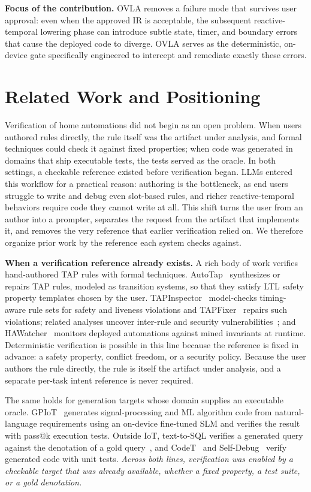 \documentclass[sigconf,nonacm,anonymous,review]{acmart}
\begin{document}
\textbf{Focus of the contribution.} OVLA removes a failure mode that survives user approval: even when the approved IR is acceptable, the subsequent reactive-temporal lowering phase can introduce subtle state, timer, and boundary errors that cause the deployed code to diverge. OVLA serves as the deterministic, on-device gate specifically engineered to intercept and remediate exactly these errors.

\section{Related Work and Positioning}

Verification of home automations did not begin as an open problem. When users authored rules directly, the rule itself was the artifact under analysis, and formal techniques could check it against fixed properties; when code was generated in domains that ship executable tests, the tests served as the oracle. In both settings, a checkable reference existed before verification began. LLMs entered this workflow for a practical reason: authoring is the bottleneck, as end users struggle to write and debug even slot-based rules, and richer reactive-temporal behaviors require code they cannot write at all. This shift turns the user from an author into a prompter, separates the request from the artifact that implements it, and removes the very reference that earlier verification relied on. We therefore organize prior work by the reference each system checks against.

\textbf{When a verification reference already exists.} A rich body of work verifies hand-authored TAP rules with formal techniques. AutoTap~\cite{autotap} synthesizes or repairs TAP rules, modeled as transition systems, so that they satisfy LTL safety property templates chosen by the user. TAPInspector~\cite{tapinspector} model-checks timing-aware rule sets for safety and liveness violations and TAPFixer~\cite{tapfixer} repairs such violations; related analyses uncover inter-rule and security vulnerabilities~\cite{iruler,soteria}; and HAWatcher~\cite{hawatcher} monitors deployed automations against mined invariants at runtime. Deterministic verification is possible in this line because the reference is fixed in advance: a safety property, conflict freedom, or a security policy. Because the user authors the rule directly, the rule is itself the artifact under analysis, and a separate per-task intent reference is never required.

The same holds for generation targets whose domain supplies an executable oracle. GPIoT~\cite{gpiot} generates signal-processing and ML algorithm code from natural-language requirements using an on-device fine-tuned SLM and verifies the result with pass@k execution tests. Outside IoT, text-to-SQL verifies a generated query against the denotation of a gold query~\cite{spider}, and CodeT~\cite{codet} and Self-Debug~\cite{selfdebug} verify generated code with unit tests. \emph{Across both lines, verification was enabled by a checkable target that was already available, whether a fixed property, a test suite, or a gold denotation.}
\end{document}
